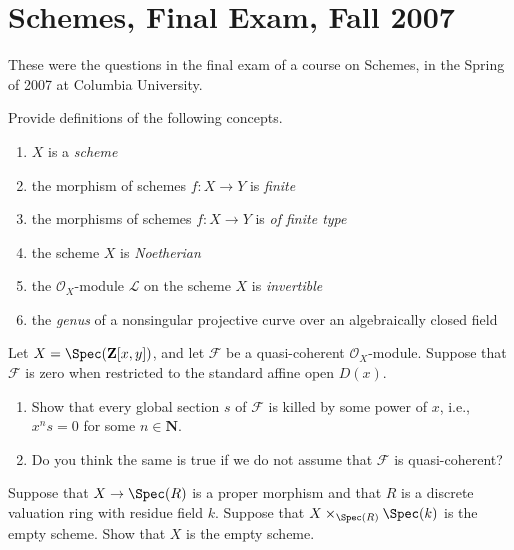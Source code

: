 \section{Schemes, Final Exam, Fall 2007}
\label{section-final-exam-fall-2007}

\noindent
These were the questions in the final exam of a course on Schemes,
in the Spring of 2007 at Columbia University.

\begin{exercise}[Definitions]
\label{exercise-definitions}
Provide definitions of the following concepts.
\begin{enumerate}
\item $X$ is a {\it scheme}
\item the morphism of schemes $f : X \to Y$ is {\it finite}
\item the morphisms of schemes $f : X \to Y$ is {\it of finite type}
\item the scheme $X$ is {\it Noetherian}
\item the ${\mathcal O}_X$-module ${\mathcal L}$ on
the scheme $X$ is {\it invertible}
\item the {\it genus} of a nonsingular
projective curve over an algebraically closed field
\end{enumerate}
\end{exercise}

\begin{exercise}
\label{exercise-kill-global-sections}
Let $X = \Spec({\mathbf Z}[x, y])$, and let ${\mathcal F}$ be a
quasi-coherent
${\mathcal O}_X$-module. Suppose that ${\mathcal F}$ is zero when restricted to
the
standard affine open $D(x)$.
\begin{enumerate}
\item Show that every global section $s$ of ${\mathcal F}$ is killed by some
power of $x$, i.e., $x^ns = 0$ for some $n\in {\mathbf N}$.
\item Do you think the same is true if we do not assume that ${\mathcal F}$
is quasi-coherent?
\end{enumerate}
\end{exercise}

\begin{exercise}
\label{exercise-empty-fibre-empty}
Suppose that $X \to \Spec(R)$ is a proper morphism and that
$R$ is a discrete valuation ring with residue field $k$. Suppose that
$X \times_{\Spec(R)} \Spec(k)$ is the empty scheme. Show that
$X$ is the empty scheme.
\end{exercise}

